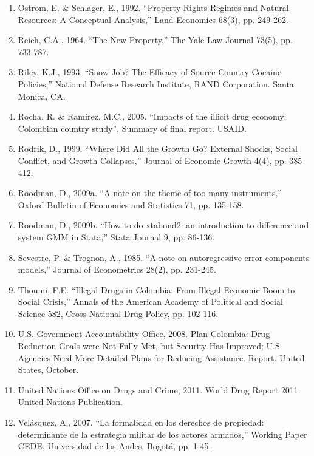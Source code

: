 \documentclass[12pt,a4paper,english]{article}%
\begin{document}
\begin{enumerate}
\item Ostrom, E. \& Schlager, E., 1992. ``Property-Rights Regimes and Natural Resources: A Conceptual Analysis,'' Land Economics 68(3), pp. 249-262.

\item Reich, C.A., 1964. ``The New Property,'' The Yale Law Journal 73(5), pp. 733-787.

\item Riley, K.J., 1993. ``Snow Job? The Efficacy of Source Country Cocaine Policies,'' National Defense Research Institute, RAND Corporation. Santa Monica, CA.

\item Rocha, R. \& Ram\'{i}rez, M.C., 2005. ``Impacts of the illicit drug economy: Colombian country study'', Summary of final report. USAID.

\item Rodrik, D., 1999. ``Where Did All the Growth Go? External Shocks, Social Conflict, and Growth Collapses,'' Journal of Economic Growth 4(4), pp. 385-412.

\item Roodman, D., 2009a. ``A note on the theme of too many instruments,'' Oxford Bulletin of Economics and Statistics 71, pp. 135-158.

 \item Roodman, D., 2009b. ``How to do xtabond2: an introduction to difference and system GMM in Stata,'' Stata Journal 9, pp. 86-136.

 \item Sevestre, P. \& Trognon, A., 1985. ``A note on autoregressive error components models,'' Journal of Econometrics 28(2), pp. 231-245.

\item  Thoumi, F.E. ``Illegal Drugs in Colombia: From Illegal Economic Boom to Social Crisis,'' Annals of the American Academy of Political and Social Science 582, Cross-National Drug Policy, pp. 102-116.

 \item U.S. Government Accountability Office, 2008. Plan Colombia: Drug Reduction Goals were Not Fully Met, but Security Has Improved; U.S. Agencies Need More Detailed Plans for Reducing Assistance. Report. United States, October.

\item United Nations Office on Drugs and Crime, 2011. World Drug Report 2011. United Nations Publication.

\item Vel\'{a}squez, A., 2007. ``La formalidad en los derechos de propiedad: determinante de la estrategia militar de los actores armados,'' Working Paper CEDE, Universidad de los Andes, Bogot\'{a}, pp. 1-45.


\end{enumerate}
\end{document}
